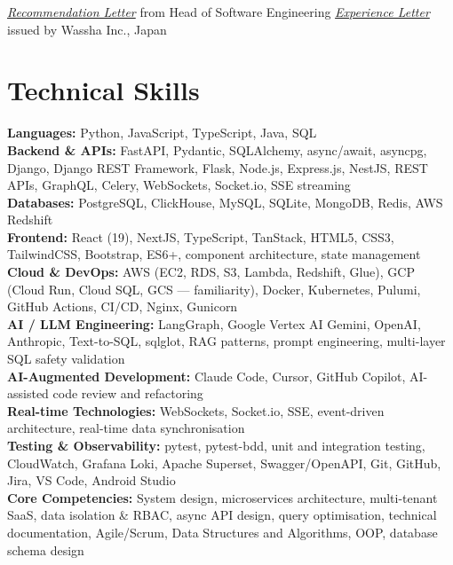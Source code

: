 \documentclass[a4paper,11.5pt]{article}
\begin{document}
\vspace{0.25em}
\href{https://drive.google.com/file/d/1AuP7vLRyYTY9FCFMkKeHPjfmX7vIQ1EI/view}{\textit{Recommendation Letter}} from Head of Software Engineering
\enspace\textbar\enspace
\href{https://drive.google.com/file/d/1u_2WggSeq51spYo9Z1i9dRnutalUn4dO/view?usp=drive_link}{\textit{Experience Letter}} issued by Wassha Inc., Japan

\vspace{0.4em}

\section*{Technical Skills}
\textbf{Languages:} Python, JavaScript, TypeScript, Java, SQL \\[0.18em]
\textbf{Backend \& APIs:} FastAPI, Pydantic, SQLAlchemy, async/await, asyncpg, Django, Django REST Framework, Flask, Node.js, Express.js, NestJS, REST APIs, GraphQL, Celery, WebSockets, Socket.io, SSE streaming \\[0.18em]
\textbf{Databases:} PostgreSQL, ClickHouse, MySQL, SQLite, MongoDB, Redis, AWS Redshift \\[0.18em]
\textbf{Frontend:} React (19), NextJS, TypeScript, TanStack, HTML5, CSS3, TailwindCSS, Bootstrap, ES6+, component architecture, state management \\[0.18em]
\textbf{Cloud \& DevOps:} AWS (EC2, RDS, S3, Lambda, Redshift, Glue), GCP (Cloud Run, Cloud SQL, GCS — familiarity), Docker, Kubernetes, Pulumi, GitHub Actions, CI/CD, Nginx, Gunicorn \\[0.18em]
\textbf{AI / LLM Engineering:} LangGraph, Google Vertex AI Gemini, OpenAI, Anthropic, Text-to-SQL, sqlglot, RAG patterns, prompt engineering, multi-layer SQL safety validation \\[0.18em]
\textbf{AI-Augmented Development:} Claude Code, Cursor, GitHub Copilot, AI-assisted code review and refactoring \\[0.18em]
\textbf{Real-time Technologies:} WebSockets, Socket.io, SSE, event-driven architecture, real-time data synchronisation \\[0.18em]
\textbf{Testing \& Observability:} pytest, pytest-bdd, unit and integration testing, CloudWatch, Grafana Loki, Apache Superset, Swagger/OpenAPI, Git, GitHub, Jira, VS Code, Android Studio \\[0.18em]
\textbf{Core Competencies:} System design, microservices architecture, multi-tenant SaaS, data isolation \& RBAC, async API design, query optimisation, technical documentation, Agile/Scrum, Data Structures and Algorithms, OOP, database schema design
\end{document}
